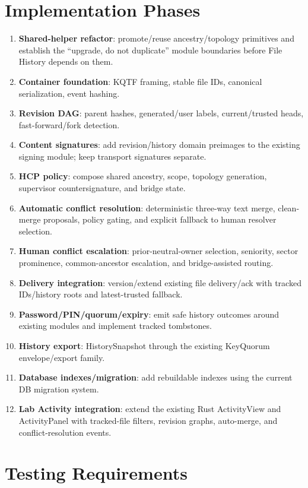 \documentclass[11pt]{article}
\begin{document}
\section{Implementation Phases}
\begin{enumerate}[leftmargin=1.8em]
  \item \textbf{Shared-helper refactor}: promote/reuse ancestry/topology primitives and establish the ``upgrade, do not duplicate'' module boundaries before File History depends on them.
  \item \textbf{Container foundation}: KQTF framing, stable file IDs, canonical serialization, event hashing.
  \item \textbf{Revision DAG}: parent hashes, generated/user labels, current/trusted heads, fast-forward/fork detection.
  \item \textbf{Content signatures}: add revision/history domain preimages to the existing signing module; keep transport signatures separate.
  \item \textbf{HCP policy}: compose shared ancestry, scope, topology generation, supervisor countersignature, and bridge state.
  \item \textbf{Automatic conflict resolution}: deterministic three-way text merge, clean-merge proposals, policy gating, and explicit fallback to human resolver selection.
  \item \textbf{Human conflict escalation}: prior-neutral-owner selection, seniority, sector prominence, common-ancestor escalation, and bridge-assisted routing.
  \item \textbf{Delivery integration}: version/extend existing file delivery/ack with tracked IDs/history roots and latest-trusted fallback.
  \item \textbf{Password/PIN/quorum/expiry}: emit safe history outcomes around existing modules and implement tracked tombstones.
  \item \textbf{History export}: HistorySnapshot through the existing KeyQuorum envelope/export family.
  \item \textbf{Database indexes/migration}: add rebuildable indexes using the current DB migration system.
  \item \textbf{Lab Activity integration}: extend the existing Rust ActivityView and ActivityPanel with tracked-file filters, revision graphs, auto-merge, and conflict-resolution events.
\end{enumerate}


\section{Testing Requirements}
\end{document}
